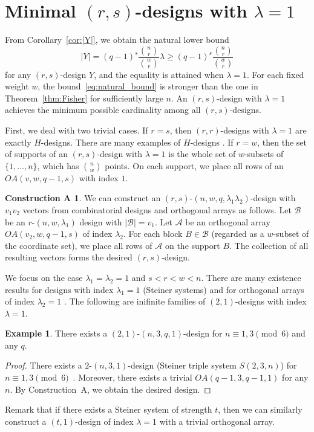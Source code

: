 \documentclass[a4paper, 11pt]{article}
\theoremstyle{definition}
\newtheorem*{constructionA}{Construction A}
\newtheorem{example}[theorem]{Example}
\begin{document}
\section{Minimal $(r,s)$-designs with $\lambda=1$} \label{sec:6}
From Corollary~\ref{cor:|Y|}, we obtain the natural lower bound
\begin{equation}
|Y|
= (q-1)^{s} \frac{\binom{n}{r}}{\binom{w}{r}} \lambda
\ge
(q-1)^{s} \frac{\binom{n}{r}}{\binom{w}{r}}
\label{eq:natural_bound}
\end{equation}
for any $(r,s)$-design $Y$, and the equality is attained when $\lambda=1$.
For each fixed weight $w$, the bound~\eqref{eq:natural_bound} is stronger
than the one in Theorem~\ref{thm:Fisher} for sufficiently large $n$.
An $(r,s)$-design with $\lambda=1$ achieves the minimum possible
cardinality among all $(r,s)$-designs. 

First, we deal with two trivial cases.
If $r=s$, then $(r,r)$-designs with $\lambda=1$ are exactly $H$-designs. There are many examples of $H$-designs \cite{CaoJiZhu07,E97,HMM86,JiWuZhu05,ZhangGe10}. 
If $r=w$, then the set of supports of an $(r,s)$-design with $\lambda=1$ is the whole set of $w$-subsets of $\{1,\ldots,n\}$, which has $\binom{n}{w}$ points.
On each support, we place all rows of an $OA(v,w,q-1,s)$ with index $1$.



\begin{constructionA} We can construct an $(r,s)$-$(n, w, q, \lambda_1 \lambda_2)$-design with $v_1v_2$ vectors from combinatorial designs and orthogonal arrays as follows.
Let $\mathcal{B}$ be an $r$-$(n,w,\lambda_1)$ design with $|\mathcal{B}|=v_1$.
Let $\mathcal{A}$ be an orthogonal array $OA(v_2, w, q-1, s)$ of index $\lambda_2$.
For each block $B \in \mathcal{B}$ (regarded as a $w$-subset of the coordinate set),
we place all rows of $\mathcal{A}$ on the support $B$.
The collection of all resulting vectors forms the desired $(r,s)$-design.
\end{constructionA}

We focus on the case $\lambda_1=\lambda_2=1$ and $s<r<w<n$. 
There are many existence results for designs with index $\lambda_1=1$ (Steiner systems) \cite{BethJungnickelLenz99,ColbournMathon07} and for orthogonal arrays of index $\lambda_2=1$ \cite{HSS99,LinStufken25}. 
The following are inifinite families of $(2,1)$-designs with index $\lambda=1$. 
\begin{example}
    There exists a $(2,1)$-$(n,3,q,1)$-design for $n \equiv 1,3 \pmod{6}$ and any $q$.  
\end{example}
\begin{proof}
There exists a $2$-$(n,3,1)$-design (Steiner triple system $S(2,3,n)$) for $n \equiv 1,3 \pmod{6}$~\cite{ColbournMathon07}. 
Moreover, there exists a trivial $OA(q-1, 3, q-1, 1)$ for any $n$.  By Construction~A, we obtain the desired design. 
\end{proof}
Remark that if there exists a Steiner system of strength $t$, then we can similarly construct a $(t,1)$-design of index $\lambda=1$ with a trivial orthogonal array.  
\end{document}
